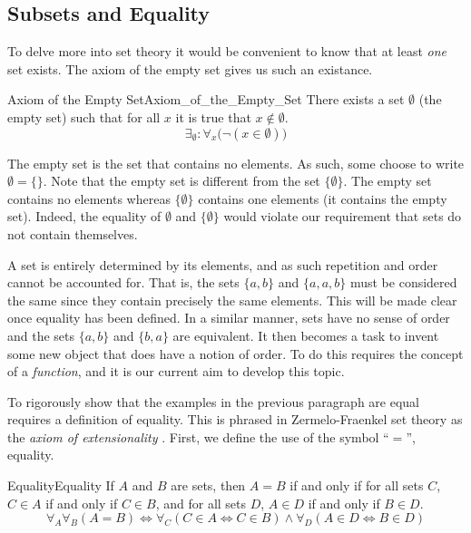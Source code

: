     \subsection{Subsets and Equality}
        To delve more into set theory it would be convenient to know that at
        least \textit{one} set exists. The axiom of the empty
        set gives us such an existance.
        \begin{faxiom}{Axiom of the Empty Set}{Axiom_of_the_Empty_Set}
            There exists a set $\emptyset$ (the \gls{empty set}) such that for
            all $x$ it is true that $x\notin\emptyset$.
            \begin{equation*}
                \exists_{\emptyset}:\forall_{x}\big(\neg(x\in\emptyset)\big)
            \end{equation*}
        \end{faxiom}
        The empty set is the set that contains no elements. As such, some choose
        to write $\emptyset=\{\}$. Note that the empty set is different from the
        set $\{\emptyset\}$. The empty set contains no elements whereas
        $\{\emptyset\}$ contains one elements (it contains the empty set).
        Indeed, the equality of $\emptyset$ and $\{\emptyset\}$ would violate
        our requirement that sets do not contain themselves.
        \par\hfill\par
        A set is entirely determined by its elements, and as such repetition and
        order cannot be accounted for. That is, the sets $\{a,b\}$ and
        $\{a,a,b\}$ must be considered the same since they contain precisely the
        same elements. This will be made clear once equality has been defined.
        In a similar manner, sets have no sense of order and the sets $\{a,b\}$
        and $\{b,a\}$ are equivalent. It then becomes a task to invent some new
        object that does have a notion of order. To do this requires the concept
        of a \textit{function}, and it is our current aim to develop this topic.
        \par\hfill\par
        To rigorously show that the examples in the previous paragraph are equal
        requires a definition of equality. This is phrased in Zermelo-Fraenkel
        set theory as the \textit{axiom of extensionality}%
        . First, we define the use of the symbol
        ``$=$'', equality.
        \begin{fnotation}{Equality}{Equality}
            If $A$ and $B$ are sets, then $A=B$ if and only if for all sets
            $C$, $C\in{A}$ if and only if $C\in{B}$, and for all sets $D$,
            $A\in{D}$ if and only if $B\in{D}$.
            \begin{equation*}
                \forall_{A}\forall_{B}(A=B)
                \Leftrightarrow\forall_{C}(C\in{A}\Leftrightarrow{C}\in{B})
                \land\forall_{D}(A\in{D}\Leftrightarrow{B}\in{D})
            \end{equation*}
        \end{fnotation}
